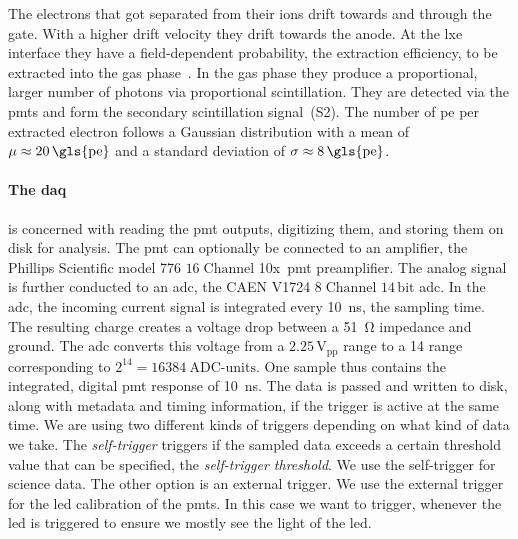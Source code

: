 The electrons that got separated from their ions drift towards and through the gate.
With a higher drift velocity they drift towards the anode.
At the \gls{lxe} interface they have a field-dependent probability, the extraction efficiency, to be extracted into the gas phase~\cite{Xu19}.
In the gas phase they produce a proportional, larger number of photons via proportional scintillation.
They are detected via the \glspl{pmt} and form the secondary scintillation signal~(S2).
The number of \gls{pe} per extracted electron follows a Gaussian distribution with a mean of $ \mu \approx \SI{20}{\gls{pe}} $ and a standard deviation of $ \sigma \approx \SI{8}{\gls{pe}} $.





\paragraph{The \gls{daq}} is concerned with reading the \gls{pmt} outputs, digitizing them, and storing them on disk for analysis.
The \gls{pmt} can optionally be connected to an amplifier, the Phillips Scientific model 776 $ 16\;\mathrm{Channel} $ 10x~\gls{pmt} preamplifier.
The analog signal is further conducted to an \gls{adc}, the CAEN V1724 $ 8\;\mathrm{Channel} $ $ 14\,\mathrm{bit} $ \gls{adc}.
In the \gls{adc}, the incoming current signal is integrated every \SI{10}{\nano\s}, the sampling time.
The resulting charge creates a voltage drop between a \SI{51}{\ohm} impedance and ground.
The \gls{adc} converts this voltage from a $ 2.25\,\mathrm{V}_\mathrm{pp} $ range to a \SI{14}{} range corresponding to $ 2^{14} = \SI{16384}{\mathrm{ADC\mbox{-}units}} $.
One sample thus contains the integrated, digital \gls{pmt} response of \SI{10}{\nano\second}.
The data is passed and written to disk, along with metadata and timing information, if the trigger is active at the same time.
We are using two different kinds of triggers depending on what kind of data we take.
The \emph{self-trigger} triggers if the sampled data exceeds a certain threshold value that can be specified, the \emph{self-trigger threshold}.
We use the self-trigger for science data.
The other option is an external trigger.
We use the external trigger for the \gls{led} calibration of the \glspl{pmt}.
In this case we want to trigger, whenever the \gls{led} is triggered to ensure we mostly see the light of the \gls{led}.



